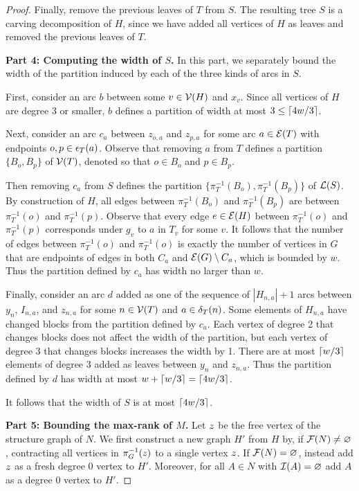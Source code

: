 \begin{proof}
Finally, remove the previous leaves of $T$ from $S$. The resulting tree $S$ is a carving decomposition of $H$, since we have added all vertices of $H$ as leaves and removed the previous leaves of $T$.

\textbf{Part 4: Computing the width of $S$.} In this part, we separately bound the width of the partition induced by each of the three kinds of arcs in $S$.

First, consider an arc $b$ between some $v \in \mathcal{V}(H)$ and $x_v$. Since all vertices of $H$ are degree 3 or smaller, $b$ defines a partition of width at most $3 \leq \lceil4w/3\rceil$.

Next, consider an arc $c_a$ between $z_{o,a}$ and $z_{p,a}$ for some arc $a \in \mathcal{E}(T)$ with endpoints $o, p \in \epsilon_{T}(a)$.
Observe that removing $a$ from $T$ defines a partition $\{B_o, B_p\}$ of $\mathcal{V}(T)$, denoted so that $o \in B_o$ and $p \in B_p$. 

Then removing $c_a$ from $S$ defines the partition $\{ \pi_T^{-1}(B_o), \pi_T^{-1}(B_p) \}$ of $\mathcal{L}(S)$. By construction of $H$, all edges between $\pi_T^{-1}(B_o)$ and $\pi_T^{-1}(B_p)$ are between $\pi_T^{-1}(o)$ and $\pi_T^{-1}(p)$. Observe that every edge $e \in \mathcal{E}(H)$ between $\pi_T^{-1}(o)$ and $\pi_T^{-1}(p)$ corresponds under $g_v$ to $a$ in $T_v$ for some $v$. It follows that the number of edges between $\pi_T^{-1}(o)$ and $\pi_T^{-1}(o)$ is exactly the number of vertices in $G$ that are endpoints of edges in both $C_a$ and $\mathcal{E}(G) \setminus C_a$, which is bounded by $w$. Thus the partition defined by $c_a$ has width no larger than $w$. 

Finally, consider an arc $d$ added as one of the sequence of $|H_{n,a}|+1$ arcs between $y_n$, $I_{n,a}$, and $z_{n,a}$ for some $n \in \mathcal{V}(T)$ and $a \in \delta_{T}(n)$. Some elements of $H_{n,a}$ have changed blocks from the partition defined by $c_a$. Each vertex of degree 2 that changes blocks does not affect the width of the partition, but each vertex of degree 3 that changes blocks increases the width by 1. There are at most $\lceil w/3\rceil$ elements of degree 3 added as leaves between $y_n$ and $z_{n,a}$. Thus the partition defined by $d$ has width at most $w + \lceil w/3\rceil = \lceil4w/3\rceil$.

It follows that the width of $S$ is at most $\lceil4w/3\rceil$.

\textbf{Part 5: Bounding the max-rank of $M$.} Let $z$ be the free vertex of the structure graph of $N$. We first construct a new graph $H'$ from $H$ by, if $\mathcal{F}(N) \neq \varnothing$, contracting all vertices in $\pi_G^{-1}(z)$ to a single vertex $z$. If $\mathcal{F}(N) = \varnothing$, instead add $z$ as a fresh degree 0 vertex to $H'$. Moreover, for all $A \in N$ with $\mathcal{I}(A) = \varnothing$ add $A$ as a degree 0 vertex to $H'$. 


\end{proof}
